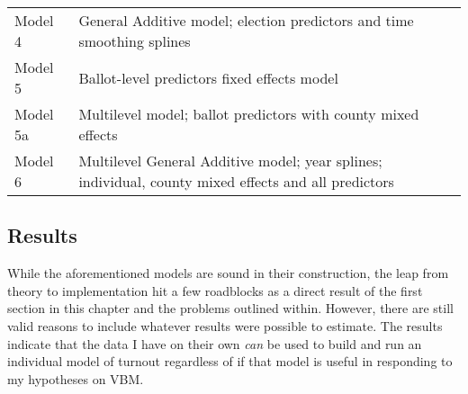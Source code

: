 \documentclass[12pt,twoside]{reedthesis}
\begin{document}
\begin{longtable}[]{@{}ll@{}}
  \begin{minipage}[t]{0.15\columnwidth}\raggedright\strut
  Model 4\strut
  \end{minipage} & \begin{minipage}[t]{0.80\columnwidth}\raggedright\strut
  General Additive model; election predictors and time smoothing
  splines\strut
  \end{minipage}\tabularnewline
  \begin{minipage}[t]{0.15\columnwidth}\raggedright\strut
  Model 5\strut
  \end{minipage} & \begin{minipage}[t]{0.80\columnwidth}\raggedright\strut
  Ballot-level predictors fixed effects model\strut
  \end{minipage}\tabularnewline
  \begin{minipage}[t]{0.15\columnwidth}\raggedright\strut
  Model 5a\strut
  \end{minipage} & \begin{minipage}[t]{0.80\columnwidth}\raggedright\strut
  Multilevel model; ballot predictors with county mixed effects\strut
  \end{minipage}\tabularnewline
  \begin{minipage}[t]{0.15\columnwidth}\raggedright\strut
  Model 6\strut
  \end{minipage} & \begin{minipage}[t]{0.80\columnwidth}\raggedright\strut
  Multilevel General Additive model; year splines; individual, county
  mixed effects and all predictors\strut
  \end{minipage}\tabularnewline
  \bottomrule
  \end{longtable}
  
  \subsection{Results}\label{results-1}
  
  While the aforementioned models are sound in their construction, the
  leap from theory to implementation hit a few roadblocks as a direct
  result of the first section in this chapter and the problems outlined
  within. However, there are still valid reasons to include whatever
  results were possible to estimate. The results indicate that the data I
  have on their own \emph{can} be used to build and run an individual
  model of turnout regardless of if that model is useful in responding to
  my hypotheses on VBM.
  
\end{document}
